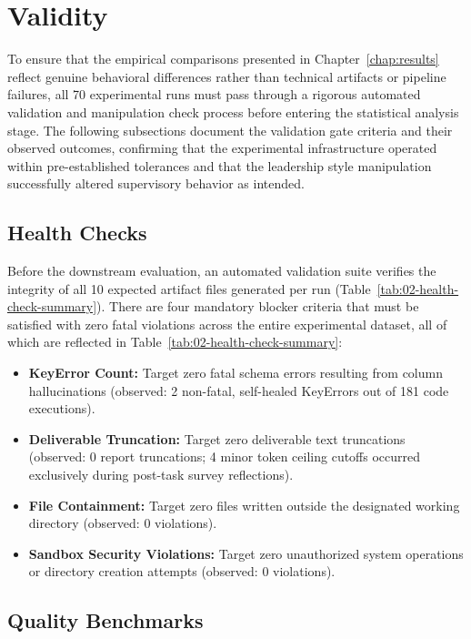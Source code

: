 \section{Validity}
\label{sec:eval-validity}

To ensure that the empirical comparisons presented in Chapter~\ref{chap:results} reflect genuine behavioral differences rather than technical artifacts or pipeline failures, all 70 experimental runs must pass through a rigorous automated validation and manipulation check process before entering the statistical analysis stage.
The following subsections document the validation gate criteria and their observed outcomes, confirming that the experimental infrastructure operated within pre-established tolerances and that the leadership style manipulation successfully altered supervisory behavior as intended.

\subsection{Health Checks}
\label{subsec:health-checks}

Before the downstream evaluation, an automated validation suite verifies the integrity of all 10 expected artifact files generated per run (Table~\ref{tab:02-health-check-summary}).
There are four mandatory blocker criteria that must be satisfied with zero fatal violations across the entire experimental dataset, all of which are reflected in Table~\ref{tab:02-health-check-summary}:
\begin{itemize}
    \item \textbf{KeyError Count:} Target zero fatal schema errors resulting from column hallucinations (observed: 2 non-fatal, self-healed KeyErrors out of 181 code executions).
    \item \textbf{Deliverable Truncation:} Target zero deliverable text truncations (observed: 0 report truncations; 4 minor token ceiling cutoffs occurred exclusively during post-task survey reflections).
    \item \textbf{File Containment:} Target zero files written outside the designated working directory (observed: 0 violations).
    \item \textbf{Sandbox Security Violations:} Target zero unauthorized system operations or directory creation attempts (observed: 0 violations).
\end{itemize}

\subsection{Quality Benchmarks}
\label{subsec:quality-benchmarks}

